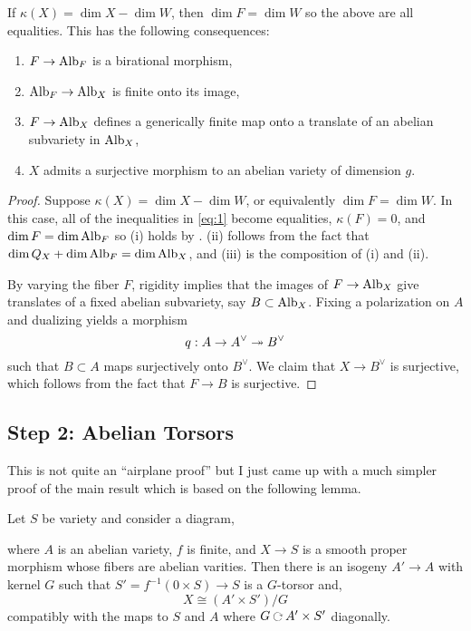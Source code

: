 \documentclass[12pt]{article}
\begin{document}
\begin{theorem} \label{non_contraction}
If $\kappa(X) = \dim{X} - \dim{W}$, then $\dim{F} = \dim{W}$ so the above are all equalities. This has the following consequences:
\begin{enumerate}
\item $F \to \mathrm{Alb}_F$ is a birational morphism,
\item $\mathrm{Alb}_F \to \mathrm{Alb}_X$ is finite \etale onto its image,
\item $F \to \mathrm{Alb}_X$ defines a generically finite map onto a translate of an abelian subvariety in $\mathrm{Alb}_{X}$,
\item $X$ admits a surjective morphism to an abelian variety of dimension $g$.
\end{enumerate}
\end{theorem}

\begin{proof}
Suppose $\kappa(X) = \dim{X} - \dim{W}$, or equivalently $\dim{F} = \dim{W}$. In this case, all of the inequalities in \eqref{eq:1} become equalities, $\kappa(F) = 0$, and $\dim{F} = \dim{\mathrm{Alb}_F}$ so (i) holds by \cite[Theorem 1]{kawamata_abelian_varieties}. (ii) follows from the fact that $\dim{Q_X} + \dim{\mathrm{Alb}_F} = \dim{\mathrm{Alb}_X}$, and (iii) is the composition of (i) and (ii).

By varying the fiber $F$, rigidity implies that the images of $F \to \mathrm{Alb}_X$ give translates of a fixed abelian subvariety, say $B \subset \mathrm{Alb}_X$. Fixing a polarization on $A$ and dualizing yields a morphism
\[ q : A \to A^\vee \twoheadrightarrow B^\vee \]
such that $B \subset A$ maps surjectively onto $B^\vee$. We claim that $X \to B^\vee$ is surjective, which follows from the fact that $F \to B$ is surjective.
\end{proof}


\subsection{Step 2: Abelian Torsors}



This is not quite an ``airplane proof'' but I just came up with a much simpler proof of the main result which is based on the following lemma.

\begin{lemma}
Let $S$ be variety and consider a diagram,
\begin{center}
\end{center}
where $A$ is an abelian variety, $f$ is finite, and $X \to S$ is a smooth proper morphism whose fibers are abelian varities. Then there is an isogeny $A' \to A$ with kernel $G$ such that $S' = f^{-1}(0 \times S) \to S$ is a $G$-torsor and,
\[ X \cong (A' \times S')/G \]
compatibly with the maps to $S$ and $A$ where $G \acts A' \times S'$ diagonally.
\end{lemma}
\end{document}
